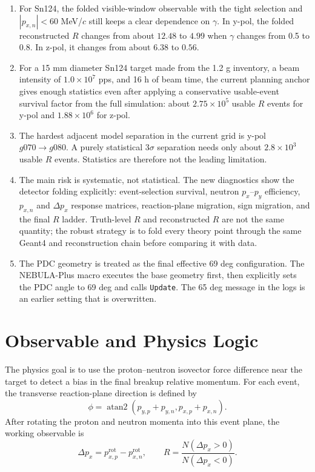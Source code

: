 \documentclass[a4paper,11pt]{article}
\begin{document}
\begin{enumerate}
  \item For Sn124, the folded visible-window observable with the tight selection and $|p_{x,n}|<60$ MeV/$c$ still keeps a clear dependence on $\gamma$. In y-pol, the folded reconstructed $R$ changes from about $12.48$ to $4.99$ when $\gamma$ changes from 0.5 to 0.8. In z-pol, it changes from about $6.38$ to $0.56$.
  \item For a 15 mm diameter Sn124 target made from the 1.2 g inventory, a beam intensity of $1.0\times10^7$ pps, and 16 h of beam time, the current planning anchor gives enough statistics even after applying a conservative usable-event survival factor from the full simulation: about $2.75\times10^5$ usable $R$ events for y-pol and $1.88\times10^6$ for z-pol.
  \item The hardest adjacent model separation in the current grid is y-pol $g070 \to g080$. A purely statistical 3$\sigma$ separation needs only about $2.8\times10^3$ usable $R$ events. Statistics are therefore not the leading limitation.
  \item The main risk is systematic, not statistical. The new diagnostics show the detector folding explicitly: event-selection survival, neutron $p_x$--$p_y$ efficiency, $p_{x,n}$ and $\Delta p_x$ response matrices, reaction-plane migration, sign migration, and the final $R$ ladder. Truth-level $R$ and reconstructed $R$ are not the same quantity; the robust strategy is to fold every theory point through the same Geant4 and reconstruction chain before comparing it with data.
  \item The PDC geometry is treated as the final effective 69 deg configuration. The NEBULA-Plus macro executes the base geometry first, then explicitly sets the PDC angle to 69 deg and calls \texttt{Update}. The 65 deg message in the logs is an earlier setting that is overwritten.
\end{enumerate}

\section{Observable and Physics Logic}

The physics goal is to use the proton--neutron isovector force difference near the target to detect a bias in the final breakup relative momentum. For each event, the transverse reaction-plane direction is defined by
\[
  \phi = \operatorname{atan2}
  \left(
    p_{y,p}+p_{y,n},
    p_{x,p}+p_{x,n}
  \right).
\]
After rotating the proton and neutron momenta into this event plane, the working observable is
\[
  \Delta p_x = p_{x,p}^{\mathrm{rot}} - p_{x,n}^{\mathrm{rot}},
  \qquad
  R = \frac{N(\Delta p_x > 0)}{N(\Delta p_x < 0)}.
\]
\end{document}
